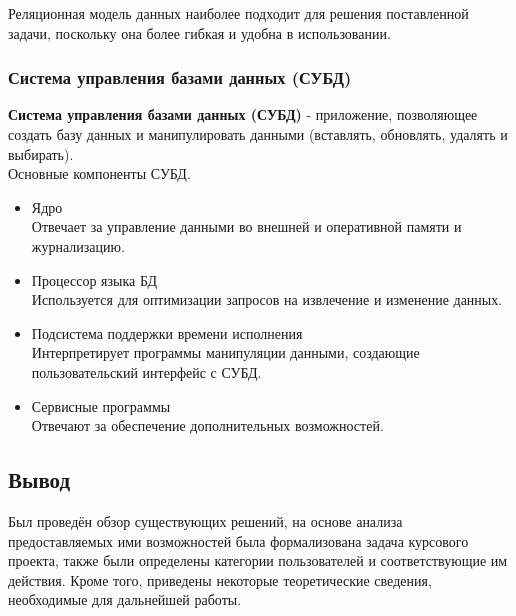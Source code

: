 	Реляционная модель данных наиболее подходит для решения поставленной задачи, поскольку она более гибкая и удобна в использовании.
	
	\subsubsection{Система управления базами данных (СУБД)}
	\textbf{Система управления базами данных (СУБД)} - приложение, позволяющее создать базу данных и манипулировать данными (вставлять, обновлять, удалять и выбирать).\\
	Основные компоненты СУБД. \cite{db_systems}
	\begin{itemize}
		\item Ядро \\
		Отвечает за управление данными во внешней и оперативной памяти и журнализацию.
		\item Процессор языка БД\\
		Используется для оптимизации запросов на извлечение и изменение данных.
		\item Подсистема поддержки времени исполнения\\
		Интерпретирует программы манипуляции данными, создающие пользовательский интерфейс с СУБД.
		\item Сервисные программы\\
		Отвечают за обеспечение дополнительных возможностей.
	\end{itemize}

	\subsection*{Вывод}
	Был проведён обзор существующих решений, на основе анализа предоставляемых ими возможностей была формализована задача курсового проекта, также были определены категории пользователей и соответствующие им действия. Кроме того, приведены некоторые теоретические сведения, необходимые для дальнейшей работы.
	
	